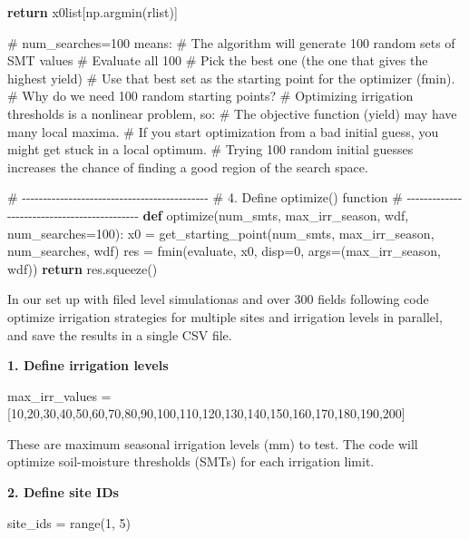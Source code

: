 \documentclass[
  letterpaper,
  DIV=11,
  numbers=noendperiod]{scrartcl}
\newenvironment{Shaded}{\begin{snugshade}}{\end{snugshade}}
\newcommand{\CommentTok}[1]{\textcolor[rgb]{0.37,0.37,0.37}{#1}}
\newcommand{\ControlFlowTok}[1]{\textcolor[rgb]{0.00,0.23,0.31}{\textbf{#1}}}
\newcommand{\DecValTok}[1]{\textcolor[rgb]{0.68,0.00,0.00}{#1}}
\newcommand{\KeywordTok}[1]{\textcolor[rgb]{0.00,0.23,0.31}{\textbf{#1}}}
\newcommand{\NormalTok}[1]{\textcolor[rgb]{0.00,0.23,0.31}{#1}}
\newcommand{\OperatorTok}[1]{\textcolor[rgb]{0.37,0.37,0.37}{#1}}
\begin{document}
\begin{Shaded}
\begin{Highlighting}[]
    \ControlFlowTok{return}\NormalTok{ x0list[np.argmin(rlist)]}

\CommentTok{\# num\_searches=100 means:}
\CommentTok{\# The algorithm will generate 100 random sets of SMT values}
\CommentTok{\# Evaluate all 100}
\CommentTok{\# Pick the best one (the one that gives the highest yield)}
\CommentTok{\# Use that best set as the starting point for the optimizer (fmin).}
\CommentTok{\# Why do we need 100 random starting points?}
\CommentTok{\# Optimizing irrigation thresholds is a nonlinear problem, so:}
\CommentTok{\# The objective function (yield) may have many local maxima.}
\CommentTok{\# If you start optimization from a bad initial guess, you might get stuck in a local optimum.}
\CommentTok{\# Trying 100 random initial guesses increases the chance of finding a good region of the search space.}

\CommentTok{\# {-}{-}{-}{-}{-}{-}{-}{-}{-}{-}{-}{-}{-}{-}{-}{-}{-}{-}{-}{-}{-}{-}{-}{-}{-}{-}{-}{-}{-}{-}{-}{-}{-}{-}{-}{-}{-}{-}{-}{-}{-}{-}{-}{-}}
\CommentTok{\# 4. Define optimize() function}
\CommentTok{\# {-}{-}{-}{-}{-}{-}{-}{-}{-}{-}{-}{-}{-}{-}{-}{-}{-}{-}{-}{-}{-}{-}{-}{-}{-}{-}{-}{-}{-}{-}{-}{-}{-}{-}{-}{-}{-}{-}{-}{-}{-}{-}{-}{-}}
\KeywordTok{def}\NormalTok{ optimize(num\_smts, max\_irr\_season, wdf, num\_searches}\OperatorTok{=}\DecValTok{100}\NormalTok{):}
\NormalTok{    x0 }\OperatorTok{=}\NormalTok{ get\_starting\_point(num\_smts, max\_irr\_season, num\_searches, wdf)}
\NormalTok{    res }\OperatorTok{=}\NormalTok{ fmin(evaluate, x0, disp}\OperatorTok{=}\DecValTok{0}\NormalTok{, args}\OperatorTok{=}\NormalTok{(max\_irr\_season, wdf))}
    \ControlFlowTok{return}\NormalTok{ res.squeeze()}
\end{Highlighting}
\end{Shaded}

In our set up with filed level simulationas and over 300 fields
following code optimize irrigation strategies for multiple sites and
irrigation levels in parallel, and save the results in a single CSV
file.

\textbf{1. Define irrigation levels}

max\_irr\_values =
{[}10,20,30,40,50,60,70,80,90,100,110,120,130,140,150,160,170,180,190,200{]}

These are maximum seasonal irrigation levels (mm) to test. The code will
optimize soil-moisture thresholds (SMTs) for each irrigation limit.

\textbf{2. Define site IDs}

site\_ids = range(1, 5)
\end{document}

